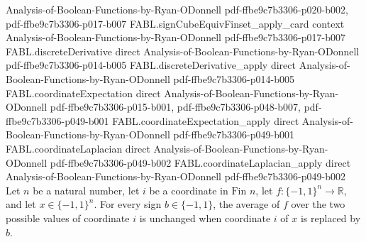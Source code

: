 \begin{theorem}
  {Analysis-of-Boolean-Functions-by-Ryan-ODonnell}
  {pdf-ffbe9c7b3306-p020-b002,
    pdf-ffbe9c7b3306-p017-b007}
\proofstep
  {FABL.signCubeEquivFinset_apply_card}
  {context}
  {Analysis-of-Boolean-Functions-by-Ryan-ODonnell}
  {pdf-ffbe9c7b3306-p017-b007}
\proofstep
  {FABL.discreteDerivative}
  {direct}
  {Analysis-of-Boolean-Functions-by-Ryan-ODonnell}
  {pdf-ffbe9c7b3306-p014-b005}
\proofstep
  {FABL.discreteDerivative_apply}
  {direct}
  {Analysis-of-Boolean-Functions-by-Ryan-ODonnell}
  {pdf-ffbe9c7b3306-p014-b005}
\proofstep
  {FABL.coordinateExpectation}
  {direct}
  {Analysis-of-Boolean-Functions-by-Ryan-ODonnell}
  {pdf-ffbe9c7b3306-p015-b001,
    pdf-ffbe9c7b3306-p048-b007,
    pdf-ffbe9c7b3306-p049-b001}
\proofstep
  {FABL.coordinateExpectation_apply}
  {direct}
  {Analysis-of-Boolean-Functions-by-Ryan-ODonnell}
  {pdf-ffbe9c7b3306-p049-b001}
\proofstep
  {FABL.coordinateLaplacian}
  {direct}
  {Analysis-of-Boolean-Functions-by-Ryan-ODonnell}
  {pdf-ffbe9c7b3306-p049-b002}
\proofstep
  {FABL.coordinateLaplacian_apply}
  {direct}
  {Analysis-of-Boolean-Functions-by-Ryan-ODonnell}
  {pdf-ffbe9c7b3306-p049-b002}
Let $n$ be a natural number, let $i$ be a coordinate in $\text{Fin }n$, let
$f:\{−1,1\}^n\to\mathbb R$, and let $x\in\{−1,1\}^n$. For every sign $b\in\{−1,1\}$, the
average of $f$ over the two possible values of coordinate $i$ is unchanged when
coordinate $i$ of $x$ is replaced by $b$.
\end{theorem}

